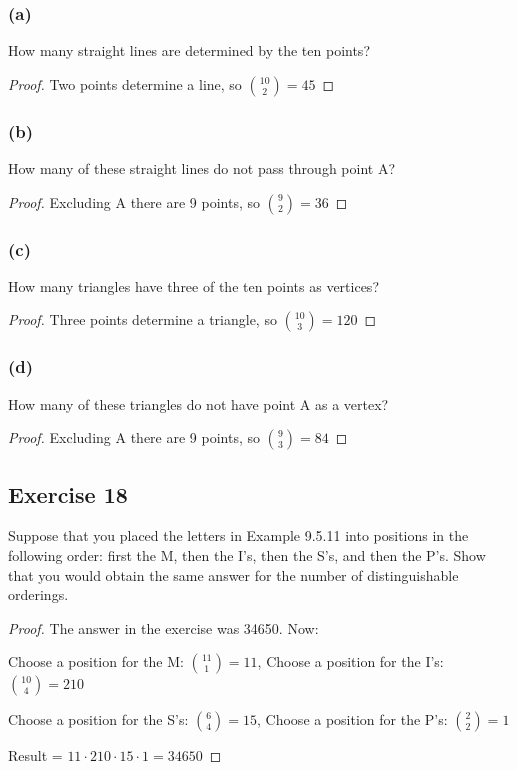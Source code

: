 \documentclass[14pt]{extarticle}
\begin{document}
\subsubsection{(a)}
How many straight lines are determined by the ten points?

\begin{proof}
     Two points determine a line, so \(\binom{10}{2} = 45\)
\end{proof}

\subsubsection{(b)}
How many of these straight lines do not pass through point A?

\begin{proof}
     Excluding A there are 9 points, so \(\binom{9}{2} = 36\)
\end{proof}

\subsubsection{(c)}
How many triangles have three of the ten points as vertices?

\begin{proof}
     Three points determine a triangle, so \(\binom{10}{3} = 120\)
\end{proof}

\subsubsection{(d)}
How many of these triangles do not have point A as a vertex?

\begin{proof}
     Excluding A there are 9 points, so \(\binom{9}{3} = 84\)
\end{proof}

\subsection{Exercise 18}
Suppose that you placed the letters in Example 9.5.11 into positions in the following order: first the M, then the
I’s, then the S’s, and then the P’s. Show that you would obtain the same answer for the number of distinguishable
orderings.

\begin{proof}
     The answer in the exercise was 34650. Now:

     Choose a position for the M: \(\binom{11}{1} = 11\),
     Choose a position for the I's: \(\binom{10}{4} = 210\)

     Choose a position for the S's: \(\binom{6}{4} = 15\),
     Choose a position for the P's: \(\binom{2}{2} = 1\)

     Result = \(11 \cdot 210 \cdot 15 \cdot 1 = 34650\)
\end{proof}
\end{document}

